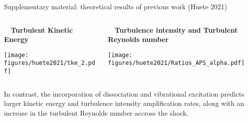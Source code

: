 \documentclass[9pt, aspectratio=1609]{beamer}
\begin{document}
\begin{frame}{\large Supplementary material: theoretical results of previous work (Huete 2021)}
    \begin{columns}[c]
    \begin{column}{.4\textwidth}%
    \begin{center}
        \vspace{-0.3cm}\textbf{$\quad$Turbulent Kinetic Energy}\\ \vspace{0.3cm}
        
        \texttt{[image: figures/huete2021/tke\_2.pdf]}
    \end{center}
    \end{column}%
    \begin{column}{.45\textwidth}
    \begin{center}
        \vspace{-0.3cm}\textbf{$\quad$Turbulence intensity and Turbulent Reynolds number}\\ \vspace{0.3cm}
        
        \texttt{[image: figures/huete2021/Ratios\_APS\_alpha.pdf]}
    \end{center}
    \end{column}%
\end{columns}
\vspace{0.3cm}
In contrast, the incorporation of dissociation and vibrational excitation predicts larger kinetic energy and turbulence intensity amplification rates, along with an increase in the turbulent Reynolds number accross the shock.
\end{frame}
\end{document}
